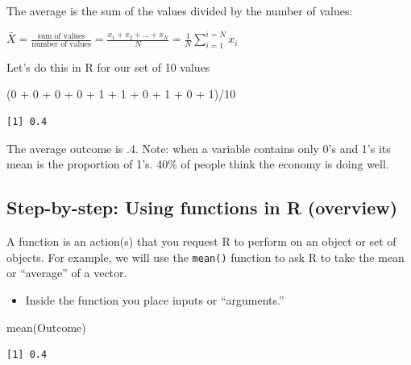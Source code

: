 \documentclass[
  letterpaper,
  DIV=11,
  numbers=noendperiod]{scrreprt}
\newenvironment{Shaded}{\begin{snugshade}}{\end{snugshade}}
\newcommand{\DecValTok}[1]{\textcolor[rgb]{0.68,0.00,0.00}{#1}}
\newcommand{\FunctionTok}[1]{\textcolor[rgb]{0.28,0.35,0.67}{#1}}
\newcommand{\NormalTok}[1]{\textcolor[rgb]{0.00,0.23,0.31}{#1}}
\newcommand{\SpecialCharTok}[1]{\textcolor[rgb]{0.37,0.37,0.37}{#1}}
\providecommand{\tightlist}{%
  \setlength{\itemsep}{0pt}\setlength{\parskip}{0pt}}\usepackage{longtable,booktabs,array}
\begin{document}
The average is the sum of the values divided by the number of values:

\(\bar{X} = \frac{\text{sum of values}}{\text{number of values}} = \frac{x_1 + x_2 + ... + x_N}{N}=\frac{1}{N}\sum_{i=1}^{i=N} x_i\)

Let's do this in R for our set of 10 values

\begin{Shaded}
\begin{Highlighting}[]
\NormalTok{(}\DecValTok{0} \SpecialCharTok{+} \DecValTok{0} \SpecialCharTok{+} \DecValTok{0} \SpecialCharTok{+} \DecValTok{0} \SpecialCharTok{+} \DecValTok{1} \SpecialCharTok{+} \DecValTok{1} \SpecialCharTok{+} \DecValTok{0} \SpecialCharTok{+} \DecValTok{1} \SpecialCharTok{+} \DecValTok{0} \SpecialCharTok{+} \DecValTok{1}\NormalTok{)}\SpecialCharTok{/}\DecValTok{10}
\end{Highlighting}
\end{Shaded}

\begin{verbatim}
[1] 0.4
\end{verbatim}

The average outcome is .4. Note: when a variable contains only 0's and
1's its mean is the proportion of 1's. 40\% of people think the economy
is doing well.

\hypertarget{step-by-step-using-functions-in-r-overview}{%
\subsection{Step-by-step: Using functions in R
(overview)}\label{step-by-step-using-functions-in-r-overview}}

A function is an action(s) that you request R to perform on an object or
set of objects. For example, we will use the \texttt{mean()} function to
ask R to take the mean or ``average'' of a vector.

\begin{itemize}
\tightlist
\item
  Inside the function you place inputs or ``arguments.''
\end{itemize}

\begin{Shaded}
\begin{Highlighting}[]
\FunctionTok{mean}\NormalTok{(Outcome)}
\end{Highlighting}
\end{Shaded}

\begin{verbatim}
[1] 0.4
\end{verbatim}
\end{document}
